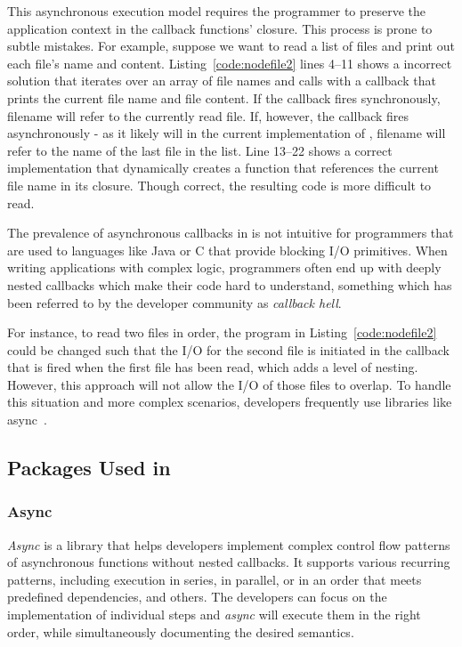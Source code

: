 This asynchronous execution model requires the programmer to preserve the
application context in the callback functions' closure.  This process
is prone to subtle mistakes.  For example, suppose we want to
read a list of files and print out each file's name and content.
Listing~\ref{code:nodefile2}  lines 4--11 shows a incorrect solution that
iterates over an array of file names and calls  with a callback
that prints the current file name and file content. 
If the callback fires synchronously, filename will refer to the currently
read file. If, however, the callback fires asynchronously - as it likely will
in the current implementation of , filename will refer to the
name of the last file in the list.
Line 13--22 shows a correct implementation that dynamically creates a function 
that references the current file name in its closure.
Though correct, the resulting code is more difficult to read.


The prevalence of asynchronous callbacks in \js is not intuitive for
programmers that are used to languages like Java or C that provide blocking I/O 
primitives.
When writing applications with complex logic, programmers often end up with deeply
nested callbacks which make their code hard to understand, something which has
been referred to by the developer community as \emph{callback hell}. 

For instance, to read two files in order, the program in Listing~\ref{code:nodefile2} could
be changed such that the I/O for the second file is initiated in the callback
that is fired when the first file has been read, which adds a level of nesting.
However, this approach will not allow the I/O of those files to overlap.
To handle this situation and more complex scenarios, developers frequently use 
libraries like async~\cite{async}. %


\subsection{\nodejs Packages Used in \cb}
\label{sec:nodepackage}

\subsubsection{Async}
\emph{Async} is a library that helps developers implement complex control 
flow patterns of asynchronous functions without nested callbacks.
It supports various recurring patterns, including
execution in series, in parallel, or in an order that meets predefined dependencies,
and others.
The developers can focus on the implementation of individual steps
and \emph{async} will execute them in the right order, while simultaneously 
documenting the desired semantics.

